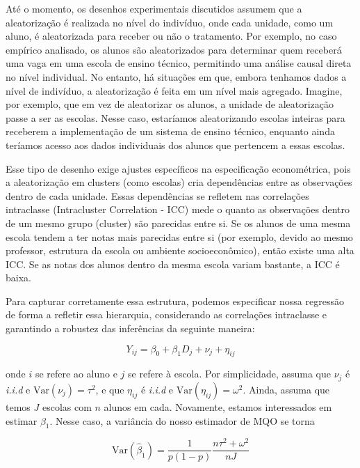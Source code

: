 Até o momento, os desenhos experimentais discutidos assumem que a aleatorização é realizada no nível do indivíduo, onde cada unidade, como um aluno, é aleatorizada para receber ou não o tratamento. Por exemplo, no caso empírico analisado, os alunos são aleatorizados para determinar quem receberá uma vaga em uma escola de ensino técnico, permitindo uma análise causal direta no nível individual. No entanto, há situações em que, embora tenhamos dados a nível de indivíduo, a aleatorização é feita em um nível mais agregado. Imagine, por exemplo, que em vez de aleatorizar os alunos, a unidade de aleatorização passe a ser as escolas. Nesse caso, estaríamos aleatorizando escolas inteiras para receberem a implementação de um sistema de ensino técnico, enquanto ainda teríamos acesso aos dados individuais dos alunos que pertencem a essas escolas. 

Esse tipo de desenho exige ajustes específicos na especificação econométrica, pois a aleatorização em clusters (como escolas) cria dependências entre as observações dentro de cada unidade. Essas dependências se refletem nas correlações intraclasse (Intracluster Correlation - ICC) mede o quanto as observações dentro de um mesmo grupo (cluster) são parecidas entre si. Se os alunos de uma mesma escola tendem a ter notas mais parecidas entre si (por exemplo, devido ao mesmo professor, estrutura da escola ou ambiente socioeconômico), então existe uma alta ICC. Se as notas dos alunos dentro da mesma escola variam bastante, a ICC é baixa.

Para capturar corretamente essa estrutura, podemos especificar nossa regressão de forma a refletir essa hierarquia, considerando as correlações intraclasse e garantindo a robustez das inferências da seguinte maneira:

\begin{equation}
    Y_{ij} = \beta_0 + \beta_1 D_j + \nu_j + \eta_{ij}
\end{equation}

\noindent onde $i$ se refere ao aluno e $j$ se refere à escola. Por simplicidade, assuma que $\nu_j$ é \textit{i.i.d} e $\mathrm{Var}(\nu_j) = \tau^2$, e que $\eta_{ij}$ é \textit{i.i.d} e $\mathrm{Var}(\eta_{ij}) = \omega^2$. Ainda, assuma que temos $J$ escolas com $n$ alunos em cada. Novamente, estamos interessados em estimar $\beta_1$. Nesse caso, a variância do nosso estimador de MQO se torna

\begin{equation}\label{varcluster}
    \mathrm{Var}(\hat{\beta}_1) = \frac{1}{p(1-p)} \frac{n\tau^2 + \omega^2}{nJ}
\end{equation}

